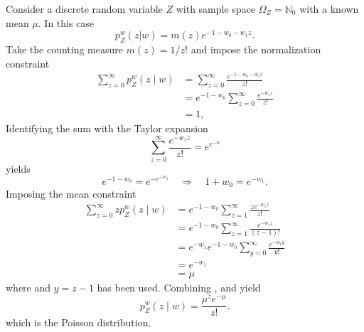 \begin{example}
	Consider a discrete random variable $Z$ with sample space $\Omega_Z = \mathbb{N}_0$ with a known mean $\mu$. In this case
	\begin{equation}
		p_{Z}^w(z|w) = m(z) e^{-1-w_0 - w_1 z}.
		\label{eq:qsa}
	\end{equation}
	Take the counting measure $m(z) = 1/z!$ and impose the normalization constraint
	\begin{equation}
		\begin{split}
			\sum_{z=0}^{\infty} p_{Z}^w(z \mid w) &= \sum_{z=0}^{\infty} \frac{e^{-1-w_0 - w_1 z}}{z!}\\
			& = e^{-1-w_0} \sum_{z=0}^{\infty} \frac{e^{-w_1 z}}{z!}\\
			& = 1,
		\end{split}
		\label{eq:asd}
	\end{equation}
	Identifying the sum with the Taylor expansion
	\begin{equation}
		\sum_{z=0}^{\infty} \frac{e^{-w_1 z}}{z!} = e^{e^{-w}}
	\end{equation}
	yields
	\begin{equation}
		e^{-1-w_0} = e^{-e^{-w_1}} \quad \Rightarrow \quad 1+w_0 = e^{-w_1}.
		\label{eq:qwe}
	\end{equation}
	Imposing the mean constraint
	\begin{equation}
		\begin{split}
			\sum_{z=0}^{\infty} z p_{Z}^w(z \mid w)& = e^{-1-w_0} \sum_{z=1}^{\infty} \frac{z e^{-w_1 z}}{z!}\\
			& = e^{-1-w_0} \sum_{z=1}^{\infty} \frac{e^{-w_1 z}}{(z-1)!}\\
			& = e^{-w_1} e^{-1-w_0}\sum_{y=0}^{\infty} \frac{e^{-w_1 y}}{y!}\\
			& = e^{-w_1}\\
			& = \mu
		\end{split}
		\label{eq:qty}
	\end{equation}
	where  and $y = z-1$ has been used. Combining ,  and  yield
	\begin{equation}
		p_{Z}^w(z\mid w) = \frac{\mu^ze^{-\mu }}{z!} .
	\end{equation}
	which is the Poisson distribution.
\end{example}



